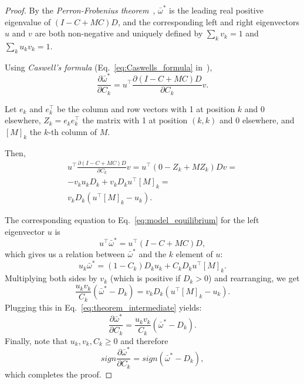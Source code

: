 \documentclass[9pt, a4paper, twocolumn]{extarticle}   	%
\newcommand*{\tr}{^\intercal}
\begin{document}
\begin{proof}
By the \emph{Perron-Frobenius theorem}~\cite[Appendix~A]{Otto2007},
$\bar{\omega}^*$ is the leading real positive eigenvalue of $(I-C+MC)D$,
and the corresponding left and right eigenvectors $u$ and $v$ are both non-negative and uniquely defined by $\sum_k{v_k} = 1$ and $\sum_k{u_k v_k} = 1$.

Using \emph{Caswell's formula} (Eq.~\ref{eq:Caswells_formula} in~),
\begin{equation}
\frac{\partial \bar{\omega}^*}{\partial C_k} = 
u\tr \frac{\partial (I-C+MC)D}{\partial C_k} v.
\end{equation}

Let $e_k$ and $e\tr_k$ be the column and row vectors with 1 at position $k$ and 0 elsewhere, $Z_k = e_k e\tr_k$ the matrix with 1 at position $(k,k)$ and 0 elsewhere, and $[M]_k$ the $k$-th column of $M$.

Then,
\begin{equation}\label{eq:theorem_intermediate}
\begin{aligned}
u\tr \frac{\partial (I-C+MC)D}{\partial C_k} v = 
u\tr (0 - Z_k + M Z_k)D v = \\
-v_k u_k D_k + v_k D_k u\tr[M]_k = \\
v_k D_k (u\tr[M]_k - u_k). 
\end{aligned}
\end{equation}

The corresponding equation to Eq.~\ref{eq:model_equilibrium} for the left
eigenvector $u$ is 
\begin{equation}
u\tr \bar{\omega}^* = u\tr (I - C + MC) D,
\end{equation}
which gives us a relation between $\bar{\omega}^*$ and the $k$
element of $u$:
\begin{equation}
u_k \bar{\omega}^* = (1-C_k) D_k u_k + C_k D_k u\tr [M]_k.
\end{equation}
Multiplying both sides by $v_k$ (which is positive if $D_k>0$) and rearranging, we get 
\begin{equation}
\frac{u_k v_k}{C_k} (\bar{\omega}^* - D_k) = v_k D_k(u\tr [M]_k - u_k).
\end{equation}
Plugging this in Eq.~\ref{eq:theorem_intermediate} yields:
\begin{equation}
\frac{\partial \bar{\omega}^*}{\partial C_k} = 
\frac{u_k v_k}{C_k} (\bar{\omega}^* - D_k).
\end{equation}
Finally, note that $u_k, v_k, C_k \ge 0$ and therefore
\begin{equation}
sign \frac{\partial \bar{\omega}^*}{\partial C_k} = 
sign (\bar{\omega}^* - D_k),
\end{equation}
which completes the proof.
\end{proof}
\end{document}
